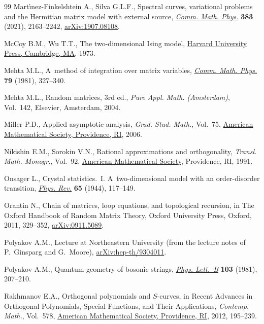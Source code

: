 \documentclass[10pt,a4paper]{amsart}
\numberwithin{equation}{section}
\begin{document}
\begin{thebibliography}{99}
Mart\'{\i}nez-Finkelshtein A., Silva G.L.F., Spectral curves, variational
 problems and the {H}ermitian matrix model with external source,
 \href{https://doi.org/10.1007/s00220-021-03999-y}{\textit{Comm. Math. Phys.}}
 \textbf{383} (2021), 2163--2242,
 \href{http://arxiv.org/abs/1907.08108}{arXiv:1907.08108}.

McCoy B.M., Wu T.T., The two-dimensional {I}sing model,
 \href{https://doi.org/10.4159/harvard.9780674180758}{Harvard University
 Press, Cambridge, MA}, 1973.

Mehta M.L., A~method of integration over matrix variables,
 \href{https://doi.org/10.1007/BF01208498}{\textit{Comm. Math. Phys.}}
 \textbf{79} (1981), 327--340.

Mehta M.L., Random matrices, 3rd ed., \textit{Pure Appl. Math. (Amsterdam)}, Vol.~142,
Elsevier, Amsterdam, 2004.

Miller P.D., Applied asymptotic analysis, \textit{Grad. Stud. Math.}, Vol.~75,
 \href{https://doi.org/10.1090/gsm/075}{American Mathematical Society,
 Providence, RI}, 2006.

Nikishin E.M., Sorokin V.N., Rational approximations and orthogonality,
 \textit{Transl. Math. Monogr.}, Vol.~92,
 \href{https://doi.org/10.1090/mmono/092}{American Mathematical Society},
 Providence, RI, 1991.

Onsager L., Crystal statistics.~{I}. {A}~two-dimensional model with an
 order-disorder transition,
 \href{https://doi.org/10.1103/PhysRev.65.117}{\textit{Phys. Rev.}}
 \textbf{65} (1944), 117--149.

Orantin N., Chain of matrices, loop equations, and topological recursion, in
 The {O}xford Handbook of Random Matrix Theory, Oxford University Press,
 Oxford, 2011, 329--352,
 \href{http://arxiv.org/abs/0911.5089}{arXiv:0911.5089}.

Polyakov A.M., Lecture at Northeastern University (from the lecture notes of
 P.~Ginsparg and G.~Moore),
 \href{http://arxiv.org/abs/hep-th/9304011}{arXiv:hep-th/9304011}.

Polyakov A.M., Quantum geometry of bosonic strings,
 \href{https://doi.org/10.1016/0370-2693(81)90743-7}{\textit{Phys. Lett.~B}}
 \textbf{103} (1981), 207--210.

Rakhmanov E.A., Orthogonal polynomials and {$S$}-curves, in Recent Advances in
 Orthogonal Polynomials, Special Functions, and Their Applications,
 \textit{Contemp. Math.}, Vol.~578,
 \href{https://doi.org/10.1090/conm/578/11484}{American Mathematical Society,
 Providence, RI}, 2012, 195--239.


\end{thebibliography}
\end{document}
